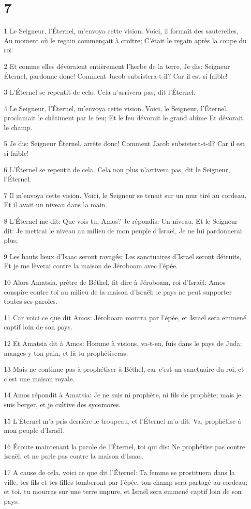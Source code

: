 \chapter{7}

\par 1 Le Seigneur, l'Éternel, m'envoya cette vision. Voici, il formait des sauterelles, Au moment où le regain commençait à croître; C'était le regain après la coupe du roi.
\par 2 Et comme elles dévoraient entièrement l'herbe de la terre, Je dis: Seigneur Éternel, pardonne donc! Comment Jacob subsistera-t-il? Car il est si faible!
\par 3 L'Éternel se repentit de cela. Cela n'arrivera pas, dit l'Éternel.
\par 4 Le Seigneur, l'Éternel, m'envoya cette vision. Voici, le Seigneur, l'Éternel, proclamait le châtiment par le feu; Et le feu dévorait le grand abîme Et dévorait le champ.
\par 5 Je dis: Seigneur Éternel, arrête donc! Comment Jacob subsistera-t-il? Car il est si faible!
\par 6 L'Éternel se repentit de cela. Cela non plus n'arrivera pas, dit le Seigneur, l'Éternel.
\par 7 Il m'envoya cette vision. Voici, le Seigneur se tenait sur un mur tiré au cordeau, Et il avait un niveau dans la main.
\par 8 L'Éternel me dit: Que vois-tu, Amos? Je répondis: Un niveau. Et le Seigneur dit: Je mettrai le niveau au milieu de mon peuple d'Israël, Je ne lui pardonnerai plus;
\par 9 Les hauts lieux d'Isaac seront ravagés; Les sanctuaires d'Israël seront détruits, Et je me lèverai contre la maison de Jéroboam avec l'épée.
\par 10 Alors Amatsia, prêtre de Béthel, fit dire à Jéroboam, roi d'Israël: Amos conspire contre toi au milieu de la maison d'Israël; le pays ne peut supporter toutes ses paroles.
\par 11 Car voici ce que dit Amos: Jéroboam mourra par l'épée, et Israël sera emmené captif loin de son pays.
\par 12 Et Amatsia dit à Amos: Homme à visions, va-t-en, fuis dans le pays de Juda; manges-y ton pain, et là tu prophétiseras.
\par 13 Mais ne continue pas à prophétiser à Béthel, car c'est un sanctuaire du roi, et c'est une maison royale.
\par 14 Amos répondit à Amatsia: Je ne suis ni prophète, ni fils de prophète; mais je suis berger, et je cultive des sycomores.
\par 15 L'Éternel m'a pris derrière le troupeau, et l'Éternel m'a dit: Va, prophétise à mon peuple d'Israël.
\par 16 Écoute maintenant la parole de l'Éternel, toi qui dis: Ne prophétise pas contre Israël, et ne parle pas contre la maison d'Isaac.
\par 17 A cause de cela, voici ce que dit l'Éternel: Ta femme se prostituera dans la ville, tes fils et tes filles tomberont par l'épée, ton champ sera partagé au cordeau; et toi, tu mourras sur une terre impure, et Israël sera emmené captif loin de son pays.

